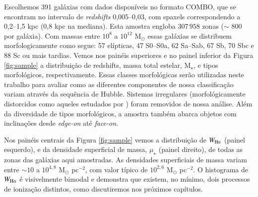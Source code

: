 Escolhemos 391 galáxias com dados disponíveis no formato COMBO, que se encontram no intervalo de {\em redshifts}  0,005--0,03, com spaxels correspondendo a 0,2--1,5 kpc (0,8 kpc na mediana). Esta amostra engloba $307\,958$ zonas ($\sim$ 800 por galáxia). Com massas entre $10^8$ a $10^{12}$ M$_\odot$ essas galáxias se distribuem morfologicamente como segue: 57 elípticas, 47 S0--S0a, 62 Sa--Sab, 67 Sb, 70 Sbc e 88 Sc ou mais tardias. Vemos nos painéis superiores e no painel inferior da Figura \ref{fig:sample} a distribuição de {\rm redshifts}, massa total estelar, M$_\star$, e tipos morfológicos, respectivamente. Essas classes morfológicas serão utilizadas neste trabalho para avaliar como as diferentes componentes de nossa classificação variam através da sequência de Hubble. Sistemas irregulares (morfológicamente distorcidos como aqueles estudados por \citealt{Wild.etal.2014, BB.etal.2015b, BB.etal.2015a, CortijoFerrero.etal.2017a, CortijoFerrero.etal.2017b}) foram removidos de nossa análise. Além da diversidade de tipos morfológicos, a amostra também abarca objetos com inclinações desde {\em edge-on} até {\em face-on}.

Nos painéis centrais da Figura \ref{fig:sample} vemos a distribuição de $W_{\Ha}$ (painel esquerdo), e da densidade superficial de massa, $\mu_\star$ (painel direito), de todas as zonas das galáxias aqui amostradas. As densidades superficiais de massa variam entre $\sim 10$ a $10^{4,8}$ M$_\odot$ pc$^{-2}$, com valor típico de $10^{2,6}$ M$_\odot$ pc$^{-2}$. O histograma de $W_{\Ha}$ é visivelmente bimodal e demonstra que existem, no mínimo, dois processos de ionização distintos, como discutiremos nos próximos capítulos.


